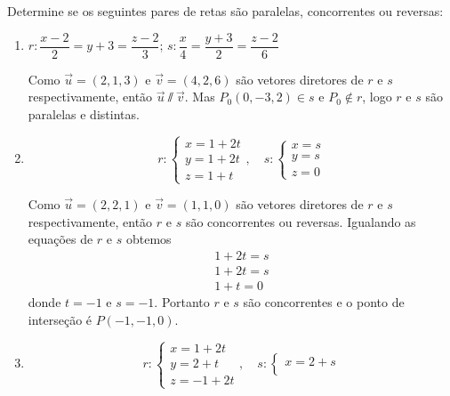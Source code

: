 \begin{exemplos}
    Determine se os seguintes pares de retas s\~ao paralelas, concorrentes ou reversas:
    \begin{enumerate}
        \item $r: \dfrac{x - 2}{2} = y + 3 = \dfrac{z - 2}{3}$; $s:\dfrac{x}{4} = \dfrac{y+3}{2} = \dfrac{z-2}{6}$
        \begin{solucao}
            Como $\vec{u} = (2,1,3)$ e $\vec{v} = (4,2,6)$ s\~ao vetores diretores de $r$ e $s$ respectivamente, ent\~ao $\vec{u}\varparallel\vec{v}$. Mas $P_0(0,-3,2)\in s$ e $P_0\notin r$, logo $r$ e $s$ s\~ao paralelas e distintas.
        \end{solucao}
        \item 
        \[
            r: \begin{cases}
                x = 1 + 2t\\
                y = 1 + 2t\\
                z = 1 + t
            \end{cases},\quad s: \begin{cases}
                x = s\\
                y = s\\
                z = 0
            \end{cases}
        \]
        \begin{solucao}
            Como $\vec{u} = (2,2,1)$ e $\vec{v} = (1,1,0)$ s\~ao vetores diretores de $r$ e $s$ respectivamente, ent\~ao $r$ e $s$ s\~ao concorrentes ou reversas. Igualando as equa\c{c}\~oes de $r$ e $s$ obtemos
            \begin{align*}
                1 + 2t = s\\
                1 + 2t = s\\
                1 + t = 0
            \end{align*}
            donde $t = -1$ e $s = -1$. Portanto $r$ e $s$ s\~ao concorrentes e o ponto de interse\c{c}\~ao \'e $P(-1,-1,0)$.
        \end{solucao}
        \item
        \[
            r: \begin{cases}
                x = 1 + 2t\\
                y = 2 + t\\
                z = -1 + 2t
            \end{cases},\quad s: \begin{cases}
                x = 2 + s\\

\end{cases}\]
\end{enumerate}
\end{exemplos}
